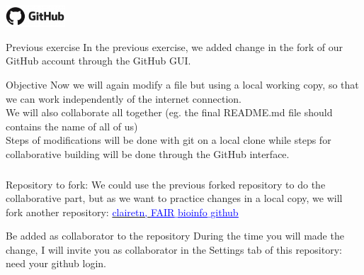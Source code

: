 \begin{frame}{\includegraphics[height=0.8cm]{shared/logo-github.png}}
\begin{exampleblock}{Previous exercise}
In the previous exercise, we added change in the fork of our GitHub account through the GitHub GUI.
\end{exampleblock}
\begin{exampleblock}{Objective}
Now we will again modify a file but using a local working copy, so that we can work independently of the internet connection.\\
We will also collaborate all together (eg. the final README.md file should contains the name of all of us) \\
Steps of modifications will be done with git on a local clone while steps for collaborative building will be done through the GitHub interface.
\end{exampleblock}
\end{frame}
\begin{frame}[containsverbatim]
\frametitle{}
\begin{exampleblock}{Repository to fork:}
We could use the previous forked repository to do the collaborative part, but as we want to practice changes in a local copy, we will fork another repository: \href{https://github.com/clairetn/FAIR_bioinfo_github.git}{\textcolor{blue}{clairetn, \underline{FAIR$\_$bioinfo$\_$github}}}
\end{exampleblock}
\begin{exampleblock}{Be added as collaborator to the repository}
During the time you will made the change, I will invite you as collaborator in the Settings tab of this repository: need your github login.
\end{exampleblock}
\end{frame}
